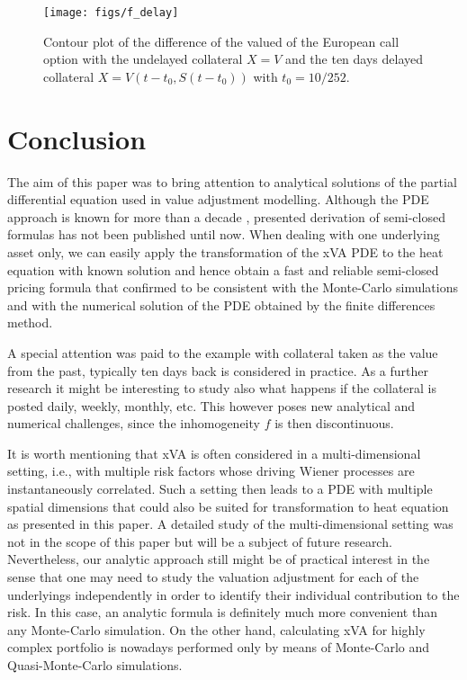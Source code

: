\documentclass[a4paper,10pt]{article}
\newcommand{\1}{\mathbf{1}}
\begin{document}
{\begin{figure}[!ht]
\centering
\texttt{[image: figs/f\_delay]}
\caption{Contour plot of the difference of the valued of the European call option with the undelayed collateral $X=V$ and the ten days delayed collateral $X = V(t-t_0,S(t-t_0))$ with $t_0 = {10}/{252}$.} \label{FIG:N_test_delayed}
\end{figure}


\section{Conclusion}\label{sec:conclusion}

The aim of this paper was to bring attention to analytical solutions of the partial differential equation used in value adjustment modelling. Although the PDE approach is known for more than a decade \citep{BurgardKjaer11PDE}, presented derivation of semi-closed formulas has not been published until now. When dealing with one underlying asset only, we can easily apply the transformation of the xVA PDE to the heat equation with known solution and hence obtain a fast and reliable semi-closed pricing formula that confirmed to be consistent with the Monte-Carlo simulations and with the numerical solution of the PDE obtained by the finite differences method. 

A special attention was paid to the example with collateral taken as the value from the past, typically ten days back is considered in practice. As a further research it might be interesting to study also what happens if the collateral is posted daily, weekly, monthly, etc. This however poses new analytical and numerical challenges, since the inhomogeneity $f$ is then discontinuous.

It is worth mentioning that xVA is often considered in a multi-dimensional setting, i.e., with multiple risk factors whose driving Wiener processes are instantaneously correlated. Such a setting then leads to a PDE with multiple spatial dimensions that could also be suited for transformation to heat equation as presented in this paper. A detailed study of the multi-dimensional setting was not in the scope of this paper but will be a subject of future research. Nevertheless, our analytic approach still might be of practical interest in the sense that one may need to study the valuation adjustment for each of the underlyings independently in order to identify their individual contribution to the risk. In this case, an analytic formula is definitely much more convenient than any Monte-Carlo simulation. On the other hand, calculating xVA for highly complex portfolio is nowadays performed only by means of Monte-Carlo and Quasi-Monte-Carlo simulations.

}
\end{document}
